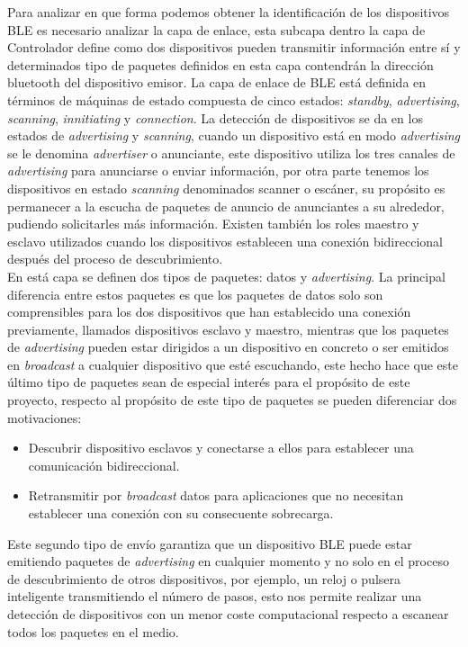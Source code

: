 \documentclass[../proyecto.tex]{subfiles}
\begin{document}
Para analizar en que forma podemos obtener la identificación de los dispositivos BLE es necesario analizar la capa de enlace, esta subcapa dentro la capa de Controlador define como dos dispositivos pueden transmitir información entre sí y determinados tipo de paquetes definidos en esta capa contendrán la dirección bluetooth del dispositivo emisor. La capa de enlace de BLE está definida en términos de máquinas de estado compuesta de cinco estados:  \textit{standby},  \textit{advertising},  \textit{scanning},  \textit{innitiating} y  \textit{connection}. La detección de dispositivos se da en los estados de \textit{advertising} y \textit{scanning}, cuando un dispositivo está en modo \textit{advertising} se le denomina \textit{advertiser} o anunciante, este dispositivo utiliza los tres canales de \textit{advertising} para anunciarse o enviar información, por otra parte tenemos los dispositivos en estado  \textit{scanning} denominados scanner o escáner, su propósito es permanecer a la escucha de paquetes de anuncio de anunciantes a su alrededor, pudiendo solicitarles más información. Existen también los roles maestro y esclavo utilizados cuando los dispositivos establecen una conexión bidireccional después del proceso de descubrimiento.\\

En está capa se definen dos tipos de paquetes: datos y \textit{advertising}. La principal diferencia entre estos paquetes es que los paquetes de datos solo son comprensibles para los dos dispositivos que han establecido una conexión previamente, llamados dispositivos esclavo y maestro, mientras que los paquetes de \textit{advertising} pueden estar dirigidos a un dispositivo en concreto o ser emitidos en \textit{broadcast} a cualquier dispositivo que esté escuchando, este hecho hace que este último tipo de paquetes sean de especial interés para el propósito de este proyecto, respecto al propósito de este tipo de paquetes se pueden diferenciar dos motivaciones:\\

\begin{itemize}
  \item Descubrir dispositivo esclavos y conectarse a ellos para establecer una comunicación bidireccional.
  \item Retransmitir por \textit{broadcast} datos para aplicaciones que no necesitan establecer una conexión con su consecuente sobrecarga.
\end{itemize}

Este segundo tipo de envío garantiza que un dispositivo BLE puede estar emitiendo paquetes de \textit{advertising} en cualquier momento y no solo en el proceso de descubrimiento de otros dispositivos, por ejemplo, un reloj o pulsera inteligente transmitiendo el número de pasos, esto nos permite realizar una detección de dispositivos con un menor coste computacional respecto a escanear todos los paquetes en el medio.\\
\end{document}
